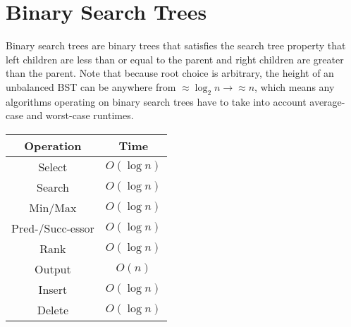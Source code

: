 \documentclass[11pt]{article}
\begin{document}
\section{Binary Search Trees}
	Binary search trees are binary trees that satisfies the search tree property that left children are less than or equal to the parent and right children are greater than the parent. Note that because root choice is arbitrary, the height of an unbalanced BST can be anywhere from $\approx \log_2 n \rightarrow \approx n$, which means any algorithms operating on binary search trees have to take into account average-case and worst-case runtimes.
	\begin{center}
	\begin{tabular}{cc}
		Operation	&	Time\\\hline
		   Select	&	$O(\log n)$\\
		   Search	&	$O(\log n)$\\
		  Min/Max	&	$O(\log n)$\\
 Pred-/Succ-essor	&	$O(\log n)$\\
		   Rank		&	$O(\log n)$\\
		   Output	&	$O(n)$\\
		   Insert	&	$O(\log n)$\\
		   Delete	&	$O(\log n)$
	\end{tabular}
	\end{center}
\end{document}
